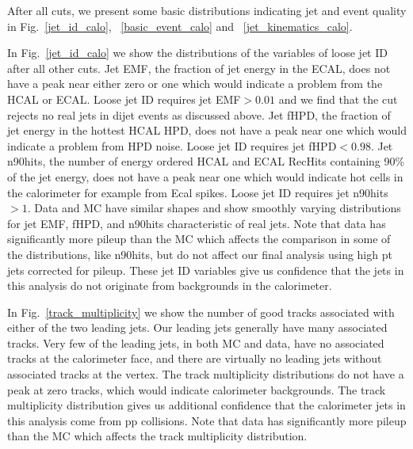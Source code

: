 
After all cuts, we present some basic distributions indicating jet and
event quality in Fig.~\ref{jet_id_calo}, ~\ref{basic_event_calo} and
~\ref{jet_kinematics_calo}.

In Fig.~\ref{jet_id_calo} we show the distributions of the variables of
loose jet ID after all other cuts.  Jet EMF, the fraction of jet
energy in the ECAL, does not have a peak near either zero or one which
would indicate a problem from the HCAL or ECAL. Loose jet ID requires
jet EMF$ > 0.01$ and we find that the cut rejects no real jets in
dijet events as discussed above. Jet fHPD, the fraction of jet energy
in the hottest HCAL HPD, does not have a peak near one which would
indicate a problem from HPD noise.  Loose jet ID requires jet fHPD$ <
0.98$.  Jet n90hits, the number of energy ordered HCAL and ECAL
RecHits containing 90\% of the jet energy, does not have a peak near
one which would indicate hot cells in the calorimeter for example from
Ecal spikes.  Loose jet ID requires jet n90hits $> 1$.  Data and MC
have similar shapes and show smoothly varying distributions for jet
EMF, fHPD, and n90hits characteristic of real jets. Note that data has
significantly more pileup than the MC which affects the comparison in
some of the distributions, like n90hits, but do not affect our final analysis
using high pt jets corrected for pileup.
These jet ID
variables give us confidence that the jets in this analysis do not
originate from backgrounds in the calorimeter.

In Fig.~\ref{track_multiplicity} we show the number of good tracks
associated with either of the two leading jets.  Our leading jets
generally have many associated tracks.  Very few of the leading jets,
in both MC and data, have no associated tracks at the calorimeter
face, and there are virtually no leading jets without associated
tracks at the vertex. The track multiplicity distributions do not have
a peak at zero tracks, which would indicate calorimeter backgrounds.
The track multiplicity distribution gives us additional confidence
that the calorimeter jets in this analysis come from pp collisions.
Note that data has
significantly more pileup than the MC which affects the track multiplicity
distribution.

